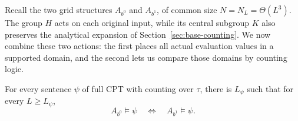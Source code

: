 Recall the two grid structures \(A_{b^0}\) and \(A_{b^1}\), of common
size \(N=N_L=\Theta(L^3)\). The group \(H\) acts on each original input,
while its central subgroup \(K\) also preserves the analytical expansion
of Section~\ref{sec:base-counting}. We now combine these two actions:
the first places all actual evaluation values in a supported domain,
and the second lets us compare those domains by counting logic.

\begin{theorem}
\label{eval:pair-equivalence}
For every sentence \(\psi\) of full CPT with counting over \(\tau\),
there is \(L_\psi\) such that for every \(L\ge L_\psi\),
\[
 A_{b^0}\models\psi
       \quad\Longleftrightarrow\quad A_{b^1}\models\psi .
\]
\end{theorem}

